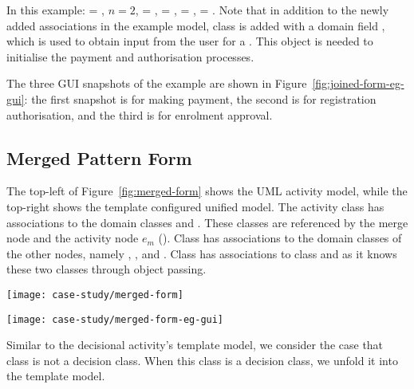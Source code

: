 In this example:  = , $ n = 2 $,  = ,  = ,  = ,  = .
Note that in addition to the newly added associations in the example model, class  is added with a domain field , which is used to obtain input from the user for a . This  object is needed to initialise the payment and authorisation processes.

The three GUI snapshots of the example are shown in Figure~\ref{fig:joined-form-eg-gui}: the first snapshot is for making payment, the second is for registration authorisation, and the third is for enrolment approval.

\subsection{Merged Pattern Form} \label{sect:merged-pattern}

The top-left of Figure~\ref{fig:merged-form} shows the UML activity model, while the top-right shows the template configured unified model. The activity class  has associations to the domain classes  and . These classes are referenced by the merge node and the activity node $ e_m $ (\resp). Class  has associations to the domain classes of the other nodes, namely , , and . Class  has associations to class  and  as it knows these two classes through object passing.

\begin{figure*}[ht]
\begin{center}
\texttt{[image: case-study/merged-form]}
\end{center}
\caption{The merged pattern form.} %
\label{fig:merged-form}
\end{figure*}
%
\begin{figure*}[ht]
\begin{center}
\texttt{[image: case-study/merged-form-eg-gui]}
\end{center}
\caption{The merged pattern form view of enrolment management activity.} %
\label{fig:merged-form-eg-gui}
\end{figure*}

Similar to the decisional activity's template model, we consider the case that class  is not a decision class. When this class is a decision class, we unfold it into the template model.

